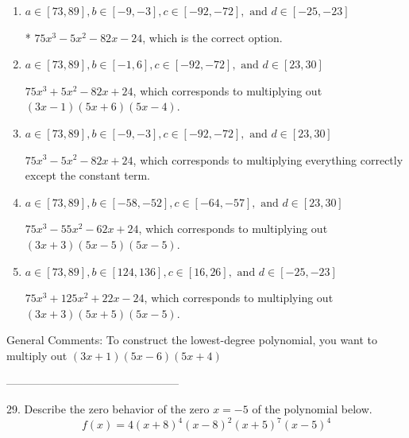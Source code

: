 \documentclass{article}[14pt]
\begin{document}
\begin{enumerate}[label=\Alph*.] 
\item $ a \in [73, 89], b \in [-9, -3], c \in [-92, -72], \text{ and } d \in [-25, -23] $ 

 * $75x^{3} -5 x^{2} -82 x -24$, which is the correct option. 
\item $ a \in [73, 89], b \in [-1, 6], c \in [-92, -72], \text{ and } d \in [23, 30] $ 

 $75x^{3} +5 x^{2} -82 x + 24$, which corresponds to multiplying out $(3x -1)(5x + 6)(5x -4)$. 
\item $ a \in [73, 89], b \in [-9, -3], c \in [-92, -72], \text{ and } d \in [23, 30] $ 

 $75x^{3} -5 x^{2} -82 x + 24$, which corresponds to multiplying everything correctly except the constant term. 
\item $ a \in [73, 89], b \in [-58, -52], c \in [-64, -57], \text{ and } d \in [23, 30] $ 

 $75x^{3} -55 x^{2} -62 x + 24$, which corresponds to multiplying out $(3x + 3)(5x -5)(5x -5)$. 
\item $ a \in [73, 89], b \in [124, 136], c \in [16, 26], \text{ and } d \in [-25, -23] $ 

 $75x^{3} +125 x^{2} +22 x -24$, which corresponds to multiplying out $(3x + 3)(5x + 5)(5x -5)$. 
\end{enumerate} 
 
General Comments: To construct the lowest-degree polynomial, you want to multiply out $(3x + 1)(5x -6)(5x + 4)$

-----------------------------------------------

29. Describe the zero behavior of the zero $x = -5$ of the polynomial below.
$$ f(x) = 4(x + 8)^{4}(x - 8)^{2}(x + 5)^{7}(x - 5)^{4} $$ 
\end{document}
